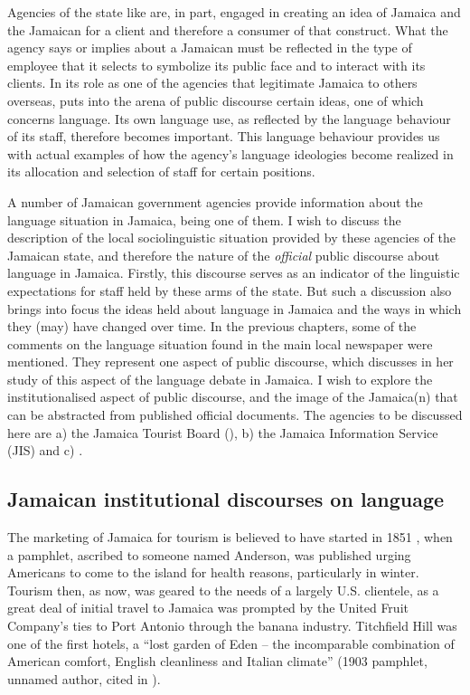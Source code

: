Agencies of the state like  are, in part, engaged in creating an idea of Jamaica and the Jamaican for a client and therefore a consumer of that construct.  What the agency says or implies about a Jamaican must be reflected in the type of employee that it selects to symbolize its public face and to interact with its clients.  In its role as one of the agencies that legitimate Jamaica to others overseas,  puts into the arena of public discourse certain ideas, one of which concerns language.  Its own language use, as reflected by the language behaviour of its staff, therefore becomes important.  This language behaviour provides us with actual examples of how the agency’s language ideologies become realized in its allocation and selection of staff for certain positions.

A number of Jamaican government agencies provide information about the language situation in Jamaica,  being one of them.  I wish to discuss the description of the local sociolinguistic situation provided by these agencies of the Jamaican state, and therefore the nature of the \textit{official} public discourse about language in Jamaica.  Firstly, this discourse serves as an indicator of the linguistic expectations for staff held by these arms of the state.  But such a discussion also brings into focus the ideas held about language in Jamaica and the ways in which they (may) have changed over time.  In the previous chapters, some of the comments on the language situation found in the main local newspaper were mentioned.  They represent one aspect of public discourse, which \citet{Christie1998b} discusses in her study of this aspect of the language debate in Jamaica.  I wish to explore the institutionalised aspect of public discourse, and the image of the Jamaica(n) that can be abstracted from published official documents.  The agencies to be discussed here are a) the Jamaica Tourist Board (), b) the Jamaica Information Service (JIS) and c) .  

\subsection{{Jamaican} {institutional} {discourses} {on} {language}}%

The marketing of Jamaica for tourism is believed to have started in 1851 \citep[62]{Taylor1971}, when a pamphlet, ascribed to someone named Anderson, was published urging Americans to come to the island for health reasons, particularly in winter.  Tourism then, as now, was geared to the needs of a largely U.S. clientele, as a great deal of initial travel to Jamaica was prompted by the United Fruit Company’s ties to Port Antonio through the banana industry.  Titchfield Hill was one of the first hotels, a “lost garden of Eden – the incomparable combination of American comfort, English cleanliness and Italian climate” (1903 pamphlet, unnamed author, cited in \citealt[99]{Taylor1971}).  

